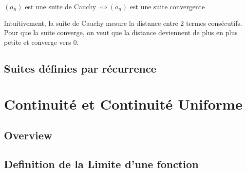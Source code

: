\documentclass{article}
\begin{document}
\begin{theorem}
    $(a_n)$ est une suite de Cauchy $\Longleftrightarrow (a_n)$ est une suite
    convergente
\end{theorem}

\begin{intuition}
    Intuitivement, la suite de Cauchy mesure la distance entre 2 termes
    consécutifs. Pour que la suite converge, on veut que la distance deviennent
    de plus en plus petite et converge vers 0.
\end{intuition}

\subsection{Suites définies par récurrence}

\begin{proposition}
\end{proposition}

\begin{problem}
\end{problem}

\pagebreak

\section{Continuité et Continuité Uniforme}

\subsection{Overview}

\subsection{Definition de la Limite d'une fonction}

\begin{definition}
\end{definition}
\end{document}
